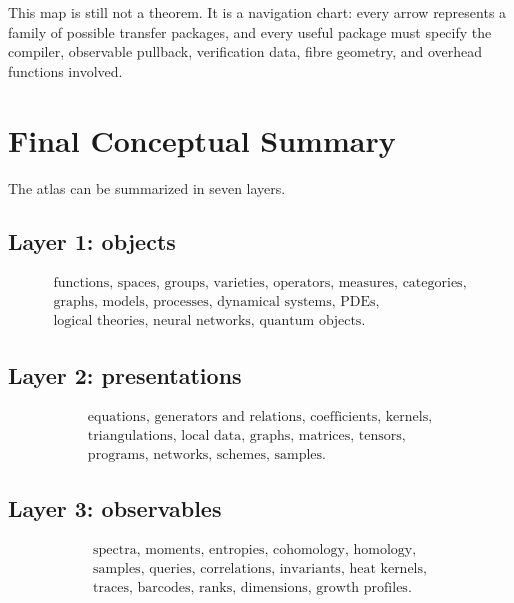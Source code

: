 \documentclass[11pt]{article}
\begin{document}
This map is still not a theorem. It is a navigation chart: every arrow represents a family of possible transfer packages, and every useful package must specify the compiler, observable pullback, verification data, fibre geometry, and overhead functions involved.

\section{Final Conceptual Summary}

The atlas can be summarized in seven layers.

\subsection{Layer 1: objects}

\[
\begin{gathered}
\text{functions, spaces, groups, varieties, operators, measures, categories},\\
\text{graphs, models, processes, dynamical systems, PDEs},\\
\text{logical theories, neural networks, quantum objects}.
\end{gathered}
\]

\subsection{Layer 2: presentations}

\[
\begin{gathered}
\text{equations, generators and relations, coefficients, kernels},\\
\text{triangulations, local data, graphs, matrices, tensors},\\
\text{programs, networks, schemes, samples}.
\end{gathered}
\]

\subsection{Layer 3: observables}

\[
\begin{gathered}
\text{spectra, moments, entropies, cohomology, homology},\\
\text{samples, queries, correlations, invariants, heat kernels},\\
\text{traces, barcodes, ranks, dimensions, growth profiles}.
\end{gathered}
\]
\end{document}
